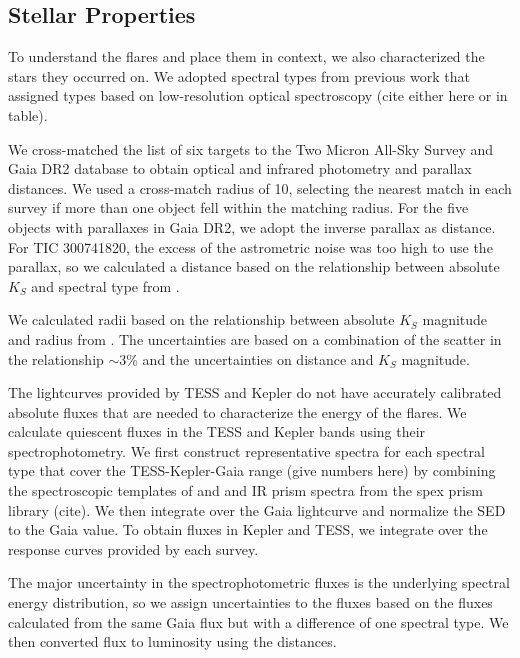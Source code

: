 \documentclass[fleqn,usenatbib,letters]{mnras}%
\newcommand{\FF}{TIC 300741820} %
\begin{document}
\subsection{Stellar Properties}
\label{sec:props}
To understand the flares and place them in context, we also characterized the stars they occurred on. We adopted spectral types from previous work that assigned types based on low-resolution optical spectroscopy (cite either here or in table).

We cross-matched the list of six targets to the Two Micron All-Sky Survey \citep[2MASS;][]{Skrutskie2006} and Gaia \citep{gaiacollaboration2016} DR2 database \citep{gaiacollaboration2018} to obtain optical and infrared photometry and parallax distances. We used a cross-match radius of 10\arcsec, selecting the nearest match in each survey if more than one object fell within the matching radius. For the five objects with parallaxes in Gaia DR2, we adopt the inverse parallax as distance. For \FF, the excess of the astrometric noise was too high to use the parallax, so we calculated a distance based on the relationship between absolute $K_S$ and spectral type from \citet{dupuy2012}.

We calculated radii based on the relationship between absolute $K_S$ magnitude and radius from \citet{Mann2015}. The uncertainties are based on a combination of the scatter in the relationship $\sim3$\% and the uncertainties on distance and $K_S$ magnitude.

The lightcurves provided by TESS and Kepler do not have accurately calibrated absolute fluxes that are needed to characterize the energy of the flares. We calculate quiescent fluxes in the TESS and Kepler bands using their spectrophotometry. We first construct representative spectra for each spectral type that cover the TESS-Kepler-Gaia range (give numbers here) by combining the spectroscopic templates of \citet{Bochanski2007} and \citet{Schmidt2014a} and IR prism spectra from the spex prism library (cite). We then integrate over the Gaia lightcurve and normalize the SED to the Gaia value. To obtain fluxes in Kepler and TESS, we integrate over the response curves provided by each survey.

The major uncertainty in the spectrophotometric fluxes is the underlying spectral energy distribution, so we assign uncertainties to the fluxes based on the fluxes calculated from the same Gaia flux but with a difference of one spectral type. We then converted flux to luminosity using the distances.
\end{document}
